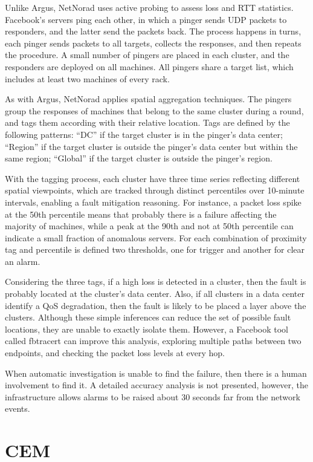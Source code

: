 Unlike Argus, NetNorad uses active probing to assess loss and RTT statistics.
Facebook's servers ping each other, in which
a pinger sends UDP packets to responders, and the latter
send the packets back. The process happens in turns, each pinger
sends packets to all targets, collects the responses, and then repeats
the procedure. A small number of pingers are placed in each cluster,
and the responders are
deployed on all machines. All pingers share a target list, which includes
at least two machines of every rack.

As with Argus, NetNorad applies spatial aggregation techniques.
The pingers group the responses of machines that belong to the same cluster
during a round, and tags them according with their relative location.
Tags are defined by the following patterns:
``DC'' if the target cluster is in the pinger's data center;
``Region'' if the target cluster is outside the pinger's
data center but within the same region;
``Global'' if the target cluster is outside the pinger's
region.

With the tagging process, each cluster have three time series reflecting
different spatial viewpoints, which are tracked through
distinct percentiles over 10-minute
intervals, enabling a fault mitigation reasoning.
For instance, a packet loss spike at the
50th percentile means that probably there is a failure affecting the majority of
machines, while a peak at the 90th and not at 50th
percentile can indicate a small fraction of anomalous servers.
For each combination of proximity tag and percentile is defined two
thresholds, one for trigger and another for clear an alarm.

Considering the three tags, if a high loss is detected in a cluster,
then the fault is probably located at the cluster's data center.
Also, if all clusters in a data center identify a QoS degradation,
then the fault is likely to be placed a layer above the clusters.
Although these simple inferences can reduce the set of possible fault locations,
they are unable to exactly isolate them.
However, a Facebook tool called fbtracert
can improve this analysis, exploring multiple
paths between two endpoints, and checking the
packet loss levels at every hop.

When automatic investigation is unable to find the failure, then there
is a human involvement to find it. A detailed accuracy analysis is not
presented, however, the infrastructure allows alarms to be raised about 30
seconds far from the network events.

\section{CEM}

